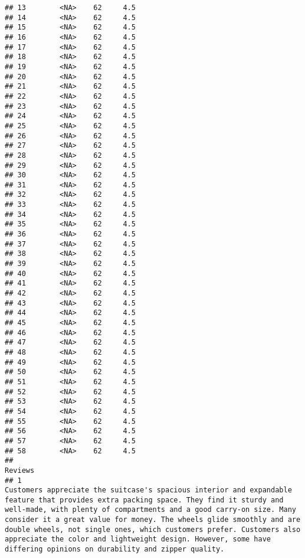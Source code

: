 \documentclass[
]{article}
\begin{document}
\begin{verbatim}
## 13        <NA>    62     4.5
## 14        <NA>    62     4.5
## 15        <NA>    62     4.5
## 16        <NA>    62     4.5
## 17        <NA>    62     4.5
## 18        <NA>    62     4.5
## 19        <NA>    62     4.5
## 20        <NA>    62     4.5
## 21        <NA>    62     4.5
## 22        <NA>    62     4.5
## 23        <NA>    62     4.5
## 24        <NA>    62     4.5
## 25        <NA>    62     4.5
## 26        <NA>    62     4.5
## 27        <NA>    62     4.5
## 28        <NA>    62     4.5
## 29        <NA>    62     4.5
## 30        <NA>    62     4.5
## 31        <NA>    62     4.5
## 32        <NA>    62     4.5
## 33        <NA>    62     4.5
## 34        <NA>    62     4.5
## 35        <NA>    62     4.5
## 36        <NA>    62     4.5
## 37        <NA>    62     4.5
## 38        <NA>    62     4.5
## 39        <NA>    62     4.5
## 40        <NA>    62     4.5
## 41        <NA>    62     4.5
## 42        <NA>    62     4.5
## 43        <NA>    62     4.5
## 44        <NA>    62     4.5
## 45        <NA>    62     4.5
## 46        <NA>    62     4.5
## 47        <NA>    62     4.5
## 48        <NA>    62     4.5
## 49        <NA>    62     4.5
## 50        <NA>    62     4.5
## 51        <NA>    62     4.5
## 52        <NA>    62     4.5
## 53        <NA>    62     4.5
## 54        <NA>    62     4.5
## 55        <NA>    62     4.5
## 56        <NA>    62     4.5
## 57        <NA>    62     4.5
## 58        <NA>    62     4.5
##                                                                                                                                                                                                                                                                                                                                                                                                                                                                                                                                                                                                                       Reviews
## 1                                                                                                                                            Customers appreciate the suitcase's spacious interior and expandable feature that provides extra packing space. They find it sturdy and well-made, with plenty of compartments and a good carry-on size. Many consider it a great value for money. The wheels glide smoothly and are double wheels, not single ones, which customers prefer. Customers also appreciate the color and lightweight design. However, some have differing opinions on durability and zipper quality.

\end{verbatim}
\end{document}
